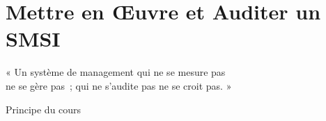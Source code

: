 
\chapter{Mettre en Œuvre et Auditer un SMSI}
\label{chap:smsi}

\epigraph{%
    « Un système de management qui ne se mesure pas\\
    ne se gère pas~; qui ne s'audite pas ne se croit pas. »%
}{Principe du cours}


